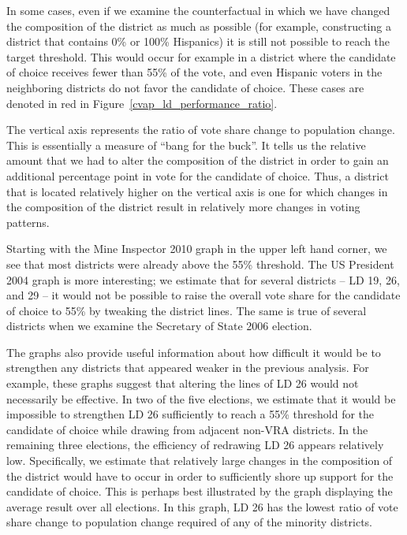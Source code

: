\documentclass[12pt]{article}
\begin{document}
In some cases, even if we examine the counterfactual in which we have changed the composition of the district as much as possible (for example, constructing a district that contains 0\% or 100\% Hispanics) it is still not possible to reach the target threshold. This would occur for example in a district where the candidate of choice receives fewer than 55\% of the vote, and even Hispanic voters in the neighboring districts do not favor the candidate of choice. These cases are denoted in red in Figure~\ref{cvap_ld_performance_ratio}. 

The vertical axis represents the ratio of vote share change to population change. This is essentially a measure of ``bang for the buck''. It tells us the relative amount that we had to alter the composition of the district in order to gain an additional percentage point in vote for the candidate of choice. Thus, a district that is located relatively higher on the vertical axis is one for which changes in the composition of the district result in relatively more changes in voting patterns. 

Starting with the Mine Inspector 2010 graph in the upper left hand corner, we see that most districts were already above the 55\% threshold. The US President 2004 graph is more interesting; we estimate that for several districts -- LD 19, 26, and 29 -- it would not be possible to raise the overall vote share for the candidate of choice to 55\% by tweaking the district lines. The same is true of several districts when we examine the Secretary of State 2006 election. 

The graphs also provide useful information about how difficult it would be to strengthen any districts that appeared weaker in the previous analysis. For example, these graphs suggest that altering the lines of LD 26 would not necessarily be effective. In two of the five elections, we estimate that it would be impossible to strengthen LD 26 sufficiently to reach a 55\% threshold for the candidate of choice while drawing from adjacent non-VRA districts. In the remaining three elections, the efficiency of redrawing LD 26 appears relatively low. Specifically, we estimate that relatively large changes in the composition of the district would have to occur in order to sufficiently shore up support for the candidate of choice. This is perhaps best illustrated by the graph displaying the average result over all elections. In this graph, LD 26 has the lowest ratio of vote share change to population change required of any of the minority districts. 
\end{document}
